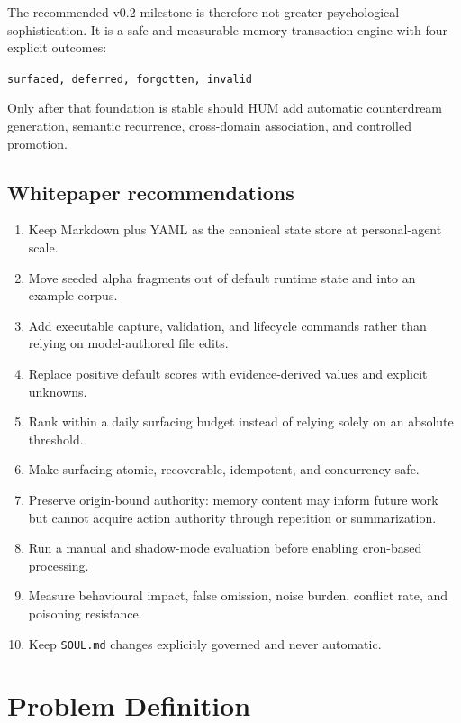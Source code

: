 \documentclass[11pt,a4paper]{article}
\begin{document}
The recommended v0.2 milestone is therefore not greater psychological sophistication. It is a safe and measurable memory transaction engine with four explicit outcomes:

\begin{center}
\texttt{surfaced, deferred, forgotten, invalid}
\end{center}

Only after that foundation is stable should HUM add automatic counterdream generation, semantic recurrence, cross-domain association, and controlled promotion.

\subsection{Whitepaper recommendations}

\begin{enumerate}
  \item Keep Markdown plus YAML as the canonical state store at personal-agent scale.
  \item Move seeded alpha fragments out of default runtime state and into an example corpus.
  \item Add executable capture, validation, and lifecycle commands rather than relying on model-authored file edits.
  \item Replace positive default scores with evidence-derived values and explicit unknowns.
  \item Rank within a daily surfacing budget instead of relying solely on an absolute threshold.
  \item Make surfacing atomic, recoverable, idempotent, and concurrency-safe.
  \item Preserve origin-bound authority: memory content may inform future work but cannot acquire action authority through repetition or summarization.
  \item Run a manual and shadow-mode evaluation before enabling cron-based processing.
  \item Measure behavioural impact, false omission, noise burden, conflict rate, and poisoning resistance.
  \item Keep \texttt{SOUL.md} changes explicitly governed and never automatic.
\end{enumerate}

\section{Problem Definition}
\end{document}

